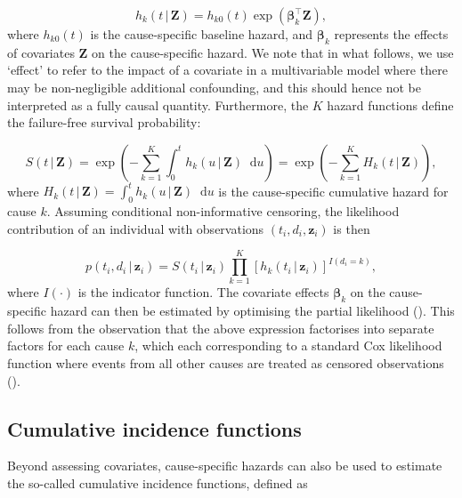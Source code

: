 \documentclass[
  letterpaper,
  DIV=11,
  numbers=noendperiod]{scrreprt}
\newcommand{\given}{\,|\,}
\newcommand\diff{\mathop{}\!\mathrm{d}}
\begin{document}
\begin{equation*}
    h_k(t \given \mathbf{Z}) = h_{k0}(t)\exp(\boldsymbol{\beta}_k^\intercal \mathbf{Z}),
\end{equation*} where \(h_{k0}(t)\) is the cause-specific baseline
hazard, and \(\boldsymbol{\beta}_k\) represents the effects of
covariates \(\mathbf{Z}\) on the cause-specific hazard. We note that in
what follows, we use `effect' to refer to the impact of a covariate in a
multivariable model where there may be non-negligible additional
confounding, and this should hence not be interpreted as a fully causal
quantity. Furthermore, the \(K\) hazard functions define the
failure-free survival probability:

\begin{equation*}
    S(t \given \mathbf{Z}) = \exp \left( - \sum_{k = 1}^{K} \int_{0}^{t} h_k(u \given \mathbf{Z}) \diff u \right)
        = \exp \left( - \sum_{k = 1}^{K} H_k(t \given \mathbf{Z}) \right),
\end{equation*} where
\(H_k(t \given \mathbf{Z}) = \int_{0}^{t} h_k(u \given \mathbf{Z}) \diff u\)
is the cause-specific cumulative hazard for cause \(k\). Assuming
conditional non-informative censoring, the likelihood contribution of an
individual with observations \((t_i, d_i, \mathbf{z}_i)\) is then

\begin{equation}
    \label{eq:likelihood}
    p(t_i, d_i \given \mathbf{z}_i) = S(t_i \given \mathbf{z}_i) \prod_{k=1}^{K} \left[ h_k(t_i \given \mathbf{z}_i) \right]^{I(d_i=k)},
\end{equation} where \(I(\cdot)\) is the indicator function. The
covariate effects \(\boldsymbol{\beta}_k\) on the cause-specific hazard
can then be estimated by optimising the partial likelihood
(). This follows from
the observation that the above expression factorises into separate
factors for each cause \(k\), which each corresponding to a standard Cox
likelihood function where events from all other causes are treated as
censored observations
().

\subsection{Cumulative incidence
functions}\label{cumulative-incidence-functions}

Beyond assessing covariates, cause-specific hazards can also be used to
estimate the so-called cumulative incidence functions, defined as
\end{document}

